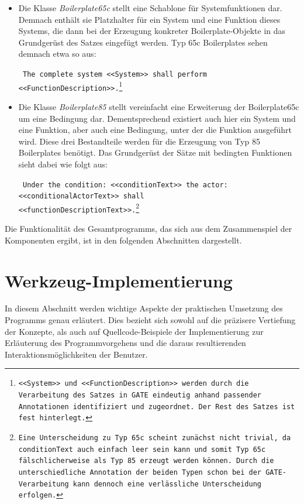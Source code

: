 \documentclass[12pt]{report}
\begin{document}
\begin{itemize}
\begin{itemize}
\item Die Klasse \textit{Boilerplate65c} stellt eine Schablone für Systemfunktionen dar. Demnach enthält sie Platzhalter für ein System und eine Funktion dieses Systems, die dann bei der Erzeugung konkreter Boilerplate-Objekte in das Grundgerüst des Satzes eingefügt werden. Typ 65c Boilerplates sehen demnach etwa so aus: 

\tt
The complete system <<System>> shall perform \\
<<FunctionDescription>>.\footnote{<<System>> und <<FunctionDescription>> werden durch die Verarbeitung des Satzes in GATE eindeutig anhand passender Annotationen identifiziert und zugeordnet. Der Rest des Satzes ist fest hinterlegt.}
\rm

\item Die Klasse \textit{Boilerplate85} stellt vereinfacht eine Erweiterung der Boilerplate65c um eine Bedingung dar. Dementsprechend existiert auch hier ein System und eine Funktion, aber auch eine Bedingung, unter der die Funktion ausgeführt wird. Diese drei Bestandteile werden für die Erzeugung von Typ 85 Boilerplates benötigt. Das Grundgerüst der Sätze mit bedingten Funktionen sieht dabei wie folgt aus:

\tt
Under the condition: <<conditionText>> the actor: \\
<<conditionalActorText>> shall \\
<<functionDescriptionText>>.\footnote{Eine Unterscheidung zu Typ 65c scheint zunächst nicht trivial, da conditionText auch einfach leer sein kann und somit Typ 65c fälschlicherweise als Typ 85 erzeugt werden können. Durch die unterschiedliche Annotation der beiden Typen schon bei der GATE-Verarbeitung kann dennoch eine verlässliche Unterscheidung erfolgen.}
\rm
\end{itemize}

\end{itemize}
Die Funktionalität des Gesamtprogramms, das sich aus dem Zusammenspiel der Komponenten ergibt, ist in den folgenden Abschnitten dargestellt.

\section[Implementierung]{Werkzeug-Implementierung}
In diesem Abschnitt werden wichtige Aspekte der praktischen Umsetzung des Programms genau erläutert. Dies bezieht sich sowohl auf die präzisere Vertiefung der Konzepte, als auch auf Quellcode-Beispiele der Implementierung zur Erläuterung des Programmvorgehens und die daraus resultierenden Interaktionsmöglichkeiten der Benutzer.  
\end{document}
